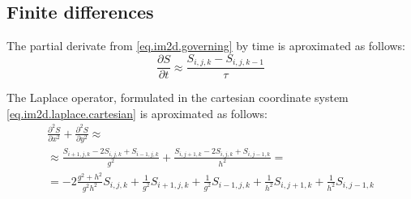 \documentclass[a4paper,10pt]{article}
\begin{document}
\subsection{Finite differences}

The partial derivate from \eqref{eq.im2d.governing} by time is aproximated as follows:
\begin{equation}\label{eq.im2d.time}
    \frac{\partial S}{\partial t}
    \approx
    \frac{S_{i,j,k} - S_{i,j,k-1}}{\tau}
\end{equation}


The Laplace operator, formulated in the cartesian coordinate system \eqref{eq.im2d.laplace.cartesian}
is aproximated as follows:
\begin{multline}\label{eq.im2d.diffusion.cartesian}
    \frac{\partial^2 S}{\partial x^2} + \frac{\partial^2 S}{\partial y^2}
    \approx
    \\%
    \approx
    \frac{S_{i+1,j,k} - 2 S_{i,j,k} + S_{i-1,j,k}}{g^2} +
    \frac{S_{i,j+1,k} - 2 S_{i,j,k} + S_{i,j-1,k}}{h^2}
    =
    \\%
    =
    -2\frac{g^2 + h^2}{g^2 h^2} S_{i,j,k}
    +\frac{1}{g^2}              S_{i+1,j,k}
    +\frac{1}{g^2}              S_{i-1,j,k}
    +\frac{1}{h^2}              S_{i,j+1,k}
    +\frac{1}{h^2}              S_{i,j-1,k}
\end{multline}
\end{document}
